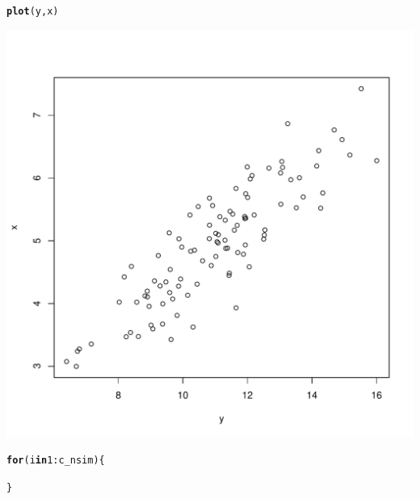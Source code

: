 \documentclass{article}\usepackage[]{graphicx}\usepackage[]{color}
\makeatletter
\def\maxwidth{ %
  \ifdim\Gin@nat@width>\linewidth
    \linewidth
  \else
    \Gin@nat@width
  \fi
}
\newcommand{\hlnum}[1]{\textcolor[rgb]{0.686,0.059,0.569}{#1}}%
\newcommand{\hlopt}[1]{\textcolor[rgb]{0,0,0}{#1}}%
\newcommand{\hlstd}[1]{\textcolor[rgb]{0.345,0.345,0.345}{#1}}%
\newcommand{\hlkwa}[1]{\textcolor[rgb]{0.161,0.373,0.58}{\textbf{#1}}}%
\newcommand{\hlkwd}[1]{\textcolor[rgb]{0.737,0.353,0.396}{\textbf{#1}}}%
\newenvironment{kframe}{%
 \def\at@end@of@kframe{}%
 \ifinner\ifhmode%
  \def\at@end@of@kframe{\end{minipage}}%
  \begin{minipage}{\columnwidth}%
 \fi\fi%
 \def\FrameCommand##1{\hskip\@totalleftmargin \hskip-\fboxsep
 \colorbox{shadecolor}{##1}\hskip-\fboxsep
     \hskip-\linewidth \hskip-\@totalleftmargin \hskip\columnwidth}%
 \MakeFramed {\advance\hsize-\width
   \@totalleftmargin\z@ \linewidth\hsize
   \@setminipage}}%
 {\par\unskip\endMakeFramed%
 \at@end@of@kframe}
\newenvironment{knitrout}{}{} %
\makeatother
\begin{document}
\begin{knitrout}
\begin{kframe}
\begin{alltt}
\hlkwd{plot}\hlstd{(y, x)}
\end{alltt}
\end{kframe}
\includegraphics[width=\maxwidth]{figure/unnamed-chunk-9-1} 
\begin{kframe}\begin{alltt}
\hlkwa{for} \hlstd{(i} \hlkwa{in} \hlnum{1}\hlopt{:}\hlstd{c_nsim) \{}

\hlstd{\}}
\end{alltt}
\end{kframe}
\end{knitrout}
\end{document}
